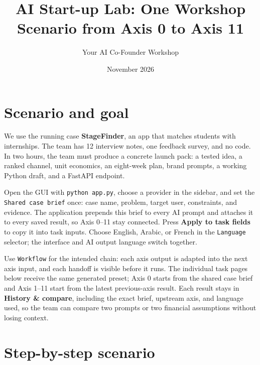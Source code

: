 \documentclass[11pt,a4paper]{article}
\title{AI Start-up Lab: One Workshop Scenario from Axis 0 to Axis 11}
\author{Your AI Co-Founder Workshop}
\date{November 2026}
\begin{document}
\maketitle

\section{Scenario and goal}
We use the running case \textbf{StageFinder}, an app that matches students with internships. The team has 12 interview notes, one feedback survey, and no code. In two hours, the team must produce a concrete launch pack: a tested idea, a ranked channel, unit economics, an eight-week plan, brand prompts, a working Python draft, and a FastAPI endpoint.

Open the GUI with \texttt{python app.py}, choose a provider in the sidebar, and set the \texttt{Shared case brief} once: case name, problem, target user, constraints, and evidence. The application prepends this brief to every AI prompt and attaches it to every saved result, so Axis 0--11 stay connected. Press \textbf{Apply to task fields} to copy it into task inputs. Choose English, Arabic, or French in the \texttt{Language} selector; the interface and AI output language switch together.

Use \texttt{Workflow} for the intended chain: each axis output is adapted into the next axis input, and each handoff is visible before it runs. The individual task pages below receive the same generated preset; Axis 0 starts from the shared case brief and Axis 1--11 start from the latest previous-axis result. Each result stays in \textbf{History \& compare}, including the exact brief, upstream axis, and language used, so the team can compare two prompts or two financial assumptions without losing context.

\section{Step-by-step scenario}
\end{document}
